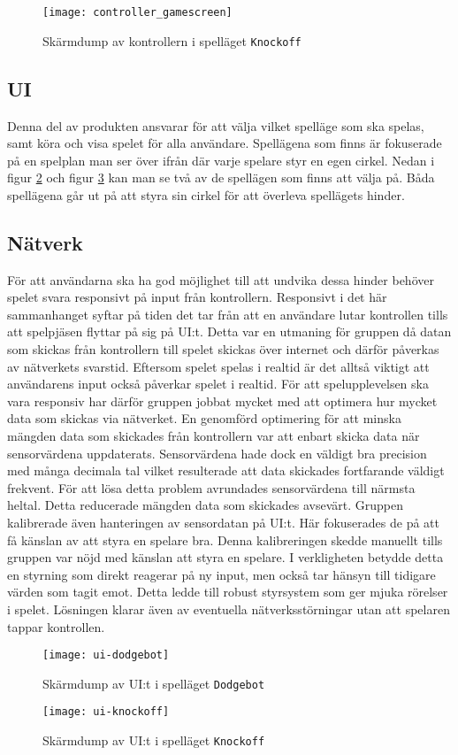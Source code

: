 \begin{figure}[h]
    \centering
    \texttt{[image: controller\_gamescreen]}
    \caption{Skärmdump av kontrollern i spelläget \texttt{Knockoff}}
    \label{fig:controller_gamescreen}
\end{figure}

\subsection{UI}
Denna del av produkten ansvarar för att välja vilket spelläge som ska spelas, samt köra och visa spelet för alla användare. Spellägena som finns är fokuserade på en spelplan man ser över ifrån där varje spelare styr en egen cirkel. Nedan i figur \ref{fig:ui-dodgebot} och figur \ref{fig:ui-knockoff} kan man se två av de spellägen som finns att välja på. Båda spellägena går ut på att styra sin cirkel för att överleva spellägets hinder. 

\subsection{Nätverk}
För att användarna ska ha god möjlighet till att undvika dessa hinder behöver spelet svara responsivt på input från kontrollern. Responsivt i det här sammanhanget syftar på tiden det tar från att en användare lutar kontrollen tills att spelpjäsen flyttar på sig på UI:t. Detta var en utmaning för gruppen då datan som skickas från kontrollern till spelet skickas över internet och därför påverkas av nätverkets svarstid. Eftersom spelet spelas i realtid är det alltså viktigt att användarens input också påverkar spelet i realtid. För att spelupplevelsen ska vara responsiv har därför gruppen jobbat mycket med att optimera hur mycket data som skickas via nätverket. En genomförd optimering för att minska mängden data som skickades från kontrollern var att enbart skicka data när sensorvärdena uppdaterats. Sensorvärdena hade dock en väldigt bra precision med många decimala tal vilket resulterade att data skickades fortfarande väldigt frekvent. För att lösa detta problem avrundades sensorvärdena till närmsta heltal. Detta reducerade mängden data som skickades avsevärt. Gruppen kalibrerade även hanteringen av sensordatan på UI:t. Här fokuserades de på att få känslan av att styra en spelare bra. Denna kalibreringen skedde manuellt tills gruppen var nöjd med känslan att styra en spelare. I verkligheten betydde detta en styrning som direkt reagerar på ny input, men också tar hänsyn till tidigare värden som tagit emot. Detta ledde till robust styrsystem som ger mjuka rörelser i spelet. Lösningen klarar även av eventuella nätverksstörningar utan att spelaren tappar kontrollen. 

\begin{figure}[h]
    \centering
    \texttt{[image: ui-dodgebot]}
    \caption{Skärmdump av UI:t i spelläget \texttt{Dodgebot}}
    \label{fig:ui-dodgebot}
\end{figure}

\begin{figure}[h]
    \centering
    \texttt{[image: ui-knockoff]}
    \caption{Skärmdump av UI:t i spelläget \texttt{Knockoff}}
    \label{fig:ui-knockoff}
\end{figure}

